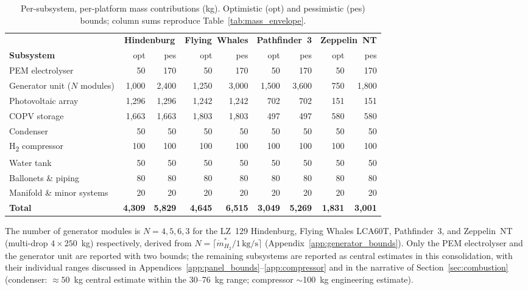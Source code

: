 \documentclass[applsci,article,submit,pdftex,moreauthors]{Definitions/mdpi}
\newcommand{\dotmstar}{\dot{m}_{H_2}^{*}}
\begin{document}
\begin{table}[H]
\centering
\footnotesize
\caption{Per-subsystem, per-platform mass contributions (kg). Optimistic (opt) and pessimistic (pes) bounds; column sums reproduce Table~\ref{tab:mass_envelope}.}
\label{tab:mass_budget_full}
\renewcommand{\arraystretch}{1.15}
\begin{tabular}{@{} l rr rr rr rr @{}}
\toprule
 & \multicolumn{2}{c}{\textbf{Hindenburg}} & \multicolumn{2}{c}{\textbf{Flying~Whales}} & \multicolumn{2}{c}{\textbf{Pathfinder~3}} & \multicolumn{2}{c}{\textbf{Zeppelin~NT}} \\
\textbf{Subsystem} & opt & pes & opt & pes & opt & pes & opt & pes \\
\midrule
PEM electrolyser            &    50 &   170 &    50 &   170 &    50 &   170 &    50 &   170 \\
Generator unit ($N$ modules) & 1{,}000 & 2{,}400 & 1{,}250 & 3{,}000 & 1{,}500 & 3{,}600 &   750 & 1{,}800 \\
Photovoltaic array          & 1{,}296 & 1{,}296 & 1{,}242 & 1{,}242 &   702 &   702 &   151 &   151 \\
COPV storage                & 1{,}663 & 1{,}663 & 1{,}803 & 1{,}803 &   497 &   497 &   580 &   580 \\
Condenser                   &    50 &    50 &    50 &    50 &    50 &    50 &    50 &    50 \\
H\textsubscript{2} compressor &   100 &   100 &   100 &   100 &   100 &   100 &   100 &   100 \\
Water tank                  &    50 &    50 &    50 &    50 &    50 &    50 &    50 &    50 \\
Ballonets \& piping         &    80 &    80 &    80 &    80 &    80 &    80 &    80 &    80 \\
Manifold \& minor systems   &    20 &    20 &    20 &    20 &    20 &    20 &    20 &    20 \\
\midrule
\textbf{Total}              & \textbf{4{,}309} & \textbf{5{,}829} & \textbf{4{,}645} & \textbf{6{,}515} & \textbf{3{,}049} & \textbf{5{,}269} & \textbf{1{,}831} & \textbf{3{,}001} \\
\bottomrule
\end{tabular}
\end{table}

The number of generator modules is $N = 4, 5, 6, 3$ for the LZ~129 Hindenburg, Flying Whales LCA60T, Pathfinder~3, and Zeppelin~NT (multi-drop $4\times250$~kg) respectively, derived from $N = \lceil\dotmstar / 1\,\mathrm{kg/s}\rceil$ (Appendix~\ref{app:generator_bounds}). Only the PEM electrolyser and the generator unit are reported with two bounds; the remaining subsystems are reported as central estimates in this consolidation, with their individual ranges discussed in Appendices~\ref{app:panel_bounds}--\ref{app:compressor} and in the narrative of Section~\ref{sec:combustion} (condenser: ${\approx}50$~kg central estimate within the 30--76~kg range; compressor $\sim$100~kg engineering estimate).
\end{document}
